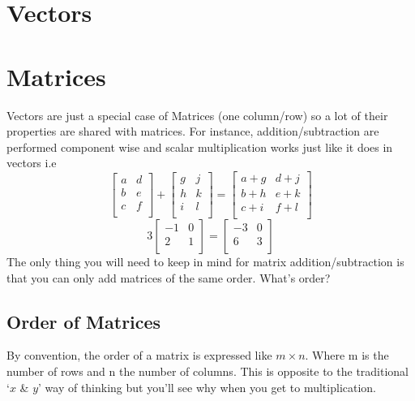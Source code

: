 \documentclass[12pt] {article}
\begin{document}
\section{Vectors}
\section{Matrices}
Vectors are just a special case of Matrices (one column/row) so a lot of their properties
are shared with matrices. For instance, addition/subtraction are performed component wise 
and scalar multiplication works just like it does in vectors i.e
\begin{equation*}
  \begin{bmatrix}
    a & d \\
    b & e \\
    c & f \\
  \end{bmatrix}
  + 
  \begin{bmatrix}
    g & j \\
    h & k \\
    i & l \\
  \end{bmatrix}
  =
  \begin{bmatrix}
    a+g & d+j \\
    b+h & e+k \\
    c+i & f+l \\
  \end{bmatrix}
\end{equation*}
\begin{equation*}
  3
  \begin{bmatrix}
    -1 & 0 \\
    2 & 1 \\
  \end{bmatrix}
  =
  \begin{bmatrix}
    -3 & 0 \\
    6 & 3 \\
  \end{bmatrix}
\end{equation*}
The only thing you will need to keep in mind for matrix addition/subtraction is 
that you can only add matrices of the same order. What's order?

\subsection*{Order of Matrices}
By convention, the order of a matrix is expressed like $m \times n$. Where m is the number
of rows and n the number of columns. This is opposite to the traditional `$x$ \& $y$' way
of thinking but you'll see why when you get to multiplication.
\end{document}
